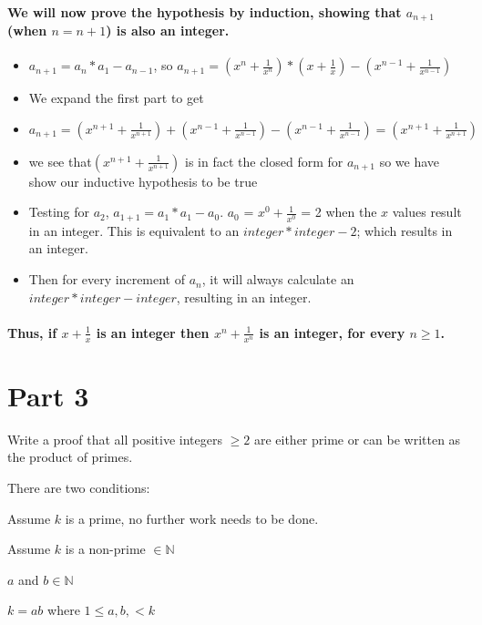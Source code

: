 \documentclass{article}
\newcounter{prob}\setcounter{prob}{1}\newcommand{\prob}{\arabic{prob}.\indent \addtocounter{prob}{1}}
\begin{document}
\paragraph{We will now prove the hypothesis by induction, showing that $a_{n+1}$ (when $n=n+1$) is also an integer. }
\begin{itemize}
	\item{$a_{n+1}=a_{n} * a_{1} -a_{n-1}$, so $a_{n+1}=(x^n + \frac{1}{x^n}) * (x + \frac{1}{x})-(x^{n-1} + \frac{1}{x^{n-1}})$}
	\item{We expand the first part to get}
	\item{$a_{n+1}=(x^{n+1}+\frac{1}{x^{n+1}})+(x^{n-1}+\frac{1}{x^{n-1}})-(x^{n-1} + \frac{1}{x^{n-1}})=(x^{n+1}+\frac{1}{x^{n+1}})$}
	\item{ we see that$(x^{n+1}+\frac{1}{x^{n+1}})$ is in fact the closed form for $a_{n+1}$ so we have show our inductive hypothesis to be true} 
	\item{Testing for $a_{2}$, $a_{1+1} = a_{1}*a_{1}-a_{0}$. $a_{0}$ = $x^0 + \frac{1}{x^0}$ = 2 when the $x$ values result in an integer. This is equivalent to an $integer*integer-2$; which results in an integer. }
	\item{Then for every increment of $a_{n}$, it will always calculate an $integer*integer-integer$, resulting in an integer. }
\end{itemize}
\paragraph{Thus, if $x + \frac{1}{x}$ is an integer then  $x^n + \frac{1}{x^n}$ is an integer, for every $\textit{n}\geq1$. }

\newpage
\section{Part 3}

Write a proof that all positive integers $\ge 2$ are either prime or can be written as the product of primes.\vspace{0.5in}

There are two conditions:

\prob Assume $k$ is a prime, no further work needs to be done.

\prob Assume $k$ is a non-prime $\in \mathbb{N}$

$a$ and $b \in \mathbb{N}$

$k = ab$ where $1 \leq a, b, < k$\vspace{0.2in}
\end{document}
